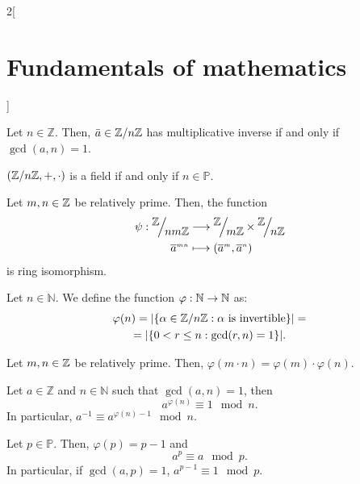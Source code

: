 \documentclass[../../../main.tex]{subfiles}
\begin{document}
\begin{multicols}{2}[\section{Fundamentals of mathematics}]
\begin{lemma}
    Let $n\in\mathbb{Z}$. Then, $\bar{a}\in\quot{\ZZ}{n\ZZ}$ has multiplicative inverse if and only if $\gcd(a,n)=1$.
  \end{lemma}
  \begin{corollary}
    $(\quot{\ZZ}{n\ZZ},+,\cdot)$ is a field if and only if $n\in\mathbb{P}$.
  \end{corollary}
  \begin{theorem}
    Let $m,n\in\mathbb{Z}$ be relatively prime. Then, the function
    \begin{align*}
      \psi:\quot{\ZZ}{nm\ZZ}               & \longrightarrow\quot{\ZZ}{m\ZZ}\times\quot{\ZZ}{n\ZZ}                                \\
      \overline{a}^{\scriptscriptstyle mn} & \longmapsto(\overline{a}^{\scriptscriptstyle m},\overline{a}^{\scriptscriptstyle n})
    \end{align*}
    is ring isomorphism.
  \end{theorem}
  \begin{definition}
    Let $n\in\mathbb{N}$. We define the function $\varphi:\mathbb{N}\rightarrow\mathbb{N}$ as:
    \begin{multline*}
      \varphi(n)=|\{\textstyle\alpha\in\quot{\ZZ}{n\ZZ}:\alpha \text{ is invertible}\}|=\\=|\{0<r\leq n: \gcd(r,n)=1\}|.
    \end{multline*}
  \end{definition}
  \begin{lemma}
    Let $m,n\in\mathbb{Z}$ be relatively prime. Then, $\varphi(m\cdot n)=\varphi(m)\cdot\varphi(n).$
  \end{lemma}
  \begin{theorem}
    Let $a\in\mathbb{Z}$ and $n\in\mathbb{N}$ such that $\gcd(a,n)=1$, then $$a^{\varphi(n)}\equiv 1\mod n.$$ In particular, $a^{-1}\equiv a^{\varphi(n)-1}\mod n$.
  \end{theorem}
  \begin{theorem}
    Let $p\in\mathbb{P}$. Then, $\varphi(p)=p-1$ and $$a^p\equiv a\mod p.$$ In particular, if $\gcd(a,p)=1$, $a^{p-1}\equiv 1\mod p$.
  \end{theorem}

\end{multicols}
\end{document}
